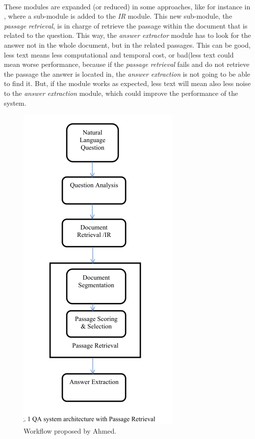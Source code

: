 \paragraph{}
These modules are expanded (or reduced) in some approaches, like for instance in \cite{Ahmed2016a}, where a sub-module is added to the \emph{IR} module. This new sub-module, the \emph{passage retrieval}, is in charge of retrieve the passage within the document that is related to the question. This way, the \emph{answer extractor} module has to look for the answer not in the whole document, but in the related passages. This can be good, less text means less computational and temporal cost, or bad(less text could mean worse performance, because if the \emph{passage retrieval} fails and do not retrieve the passage the answer is located in, the \emph{answer extraction} is not going to be able to find it. But, if the module works as expected, less text will mean also less noise to the \emph{answer extraction} module, which could improve the performance of the system.
\begin{figure}[!h]
	\centering
	\includegraphics[scale=0.35]{images/ahmed2016}
	\caption{Workflow proposed by Ahmed.}
	\label{fig:ahmed}
\end{figure}

